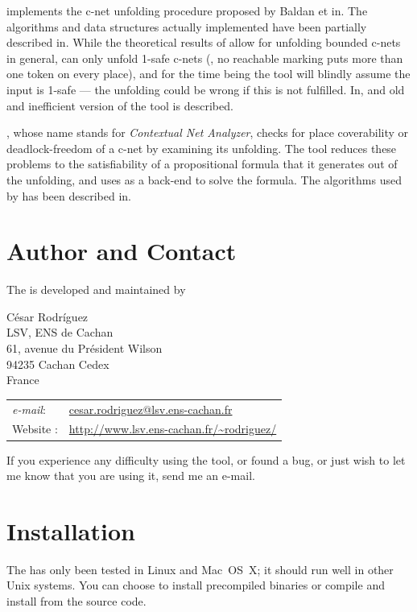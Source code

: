 \documentclass[a4paper]{refart}
\begin{document}
\cunf implements the c-net unfolding procedure proposed by Baldan et
\al in\cite{BCKS08}.  The algorithms and data structures actually
implemented have been partially described in\cite{RSB11,BBCKRS12}.  While
the theoretical results of\cite{BCKS08,RSB11,BBCKRS12} allow for unfolding
bounded c-nets in general, \cunf can only unfold 1-safe c-nets (\ie, no
reachable marking puts more than one token on every place), and for the
time being the tool will blindly assume the input is 1-safe ---
the unfolding could be wrong if this is not fulfilled.
In\cite{Rod10}, and old and inefficient version of the tool is described.

\cna, whose name stands for \emph{Contextual Net Analyzer},
checks for place coverability or deadlock-freedom of a c-net by examining
its unfolding.  The tool reduces these problems to the satisfiability of a
propositional formula that it generates out of the unfolding, and uses
\minisat\cite{ES03} as a back-end to solve the formula.
The algorithms used by \cna has been described in\cite{RS12}.

\section{Author and Contact}%
\label{s:author}

The \cunft{} is developed and maintained by 

\medskip

César Rodríguez \\[1ex]
LSV, ENS de Cachan \\
61, avenue du Président Wilson \\
94235 Cachan Cedex \\
France

\begin{tabular}{ll}
\textit{e-mail}: & \url{cesar.rodriguez@lsv.ens-cachan.fr} \\
Website        : & \url{http://www.lsv.ens-cachan.fr/~rodriguez/}
\end{tabular}

\medskip

If you experience any difficulty using the tool, or found a bug,
or just wish to let me know that you are using it, send me an e-mail.

\section{Installation}%

The \cunft{} has only been tested in Linux and Mac~OS~X; it should
run well in other Unix systems.
You can choose to install precompiled binaries or compile and install from the
source code.
\end{document}
